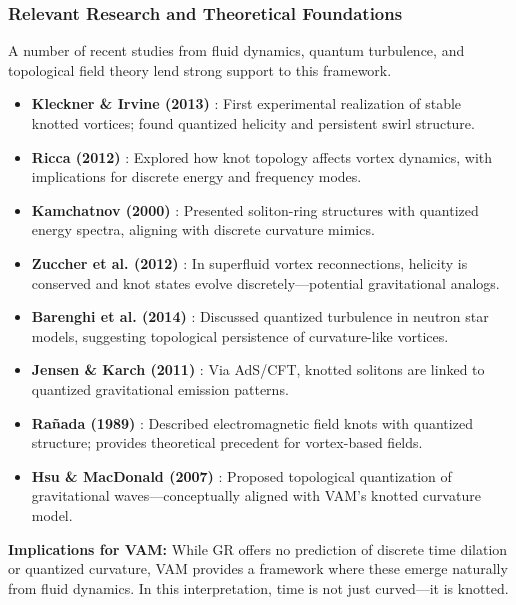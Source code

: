 \subsubsection{Relevant Research and Theoretical Foundations}

A number of recent studies from fluid dynamics, quantum turbulence, and topological field theory lend strong support to this framework.

\begin{itemize}
    \item \textbf{Kleckner \& Irvine (2013)} \cite{kleckner2013}: First experimental realization of stable knotted vortices; found quantized helicity and persistent swirl structure.

    \item \textbf{Ricca (2012)} \cite{ricca2012}: Explored how knot topology affects vortex dynamics, with implications for discrete energy and frequency modes.

    \item \textbf{Kamchatnov (2000)} \cite{kamchatnov2000}: Presented soliton-ring structures with quantized energy spectra, aligning with discrete curvature mimics.

    \item \textbf{Zuccher et al. (2012)} \cite{zuccher2012}: In superfluid vortex reconnections, helicity is conserved and knot states evolve discretely—potential gravitational analogs.

    \item \textbf{Barenghi et al. (2014)} \cite{barenghi2014}: Discussed quantized turbulence in neutron star models, suggesting topological persistence of curvature-like vortices.

    \item \textbf{Jensen \& Karch (2011)} \cite{jensen2011}: Via AdS/CFT, knotted solitons are linked to quantized gravitational emission patterns.

    \item \textbf{Rañada (1989)} \cite{ranada1989}: Described electromagnetic field knots with quantized structure; provides theoretical precedent for vortex-based fields.

    \item \textbf{Hsu \& MacDonald (2007)} \cite{hsu2007}: Proposed topological quantization of gravitational waves—conceptually aligned with VAM’s knotted curvature model.
\end{itemize}

\textbf{Implications for VAM:} While GR offers no prediction of discrete time dilation or quantized curvature, VAM provides a framework where these emerge naturally from fluid dynamics. In this interpretation, time is not just curved—it is knotted.

